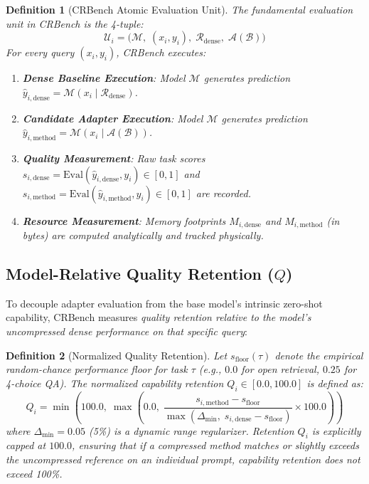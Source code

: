 \documentclass[11pt,a4paper]{article}
\newtheorem{definition}{Definition}
\begin{document}
\begin{definition}[CRBench Atomic Evaluation Unit]
The fundamental evaluation unit in CRBench is the 4-tuple:
\begin{equation}
\label{eq:eval_unit}
\boxed{
\mathcal{U}_i = \Big( \mathcal{M}, \; (x_i, y_i), \; \mathcal{R}_{\text{dense}}, \; \mathcal{A}(\mathcal{B}) \Big)
}
\end{equation}
For every query $(x_i, y_i)$, CRBench executes:
\begin{enumerate}[leftmargin=*]
    \item \textbf{Dense Baseline Execution}: Model $\mathcal{M}$ generates prediction $\hat{y}_{i, \text{dense}} = \mathcal{M}(x_i \mid \mathcal{R}_{\text{dense}})$.
    \item \textbf{Candidate Adapter Execution}: Model $\mathcal{M}$ generates prediction $\hat{y}_{i, \text{method}} = \mathcal{M}(x_i \mid \mathcal{A}(\mathcal{B}))$.
    \item \textbf{Quality Measurement}: Raw task scores $s_{i, \text{dense}} = \text{Eval}(\hat{y}_{i, \text{dense}}, y_i) \in [0, 1]$ and $s_{i, \text{method}} = \text{Eval}(\hat{y}_{i, \text{method}}, y_i) \in [0, 1]$ are recorded.
    \item \textbf{Resource Measurement}: Memory footprints $M_{i, \text{dense}}$ and $M_{i, \text{method}}$ (in bytes) are computed analytically and tracked physically.
\end{enumerate}
\end{definition}

\subsection{Model-Relative Quality Retention ($Q$)}
To decouple adapter evaluation from the base model's intrinsic zero-shot capability, CRBench measures \textit{quality retention relative to the model's uncompressed dense performance on that specific query}:

\begin{definition}[Normalized Quality Retention]
Let $s_{\text{floor}}(\tau)$ denote the empirical random-chance performance floor for task $\tau$ (e.g., $0.0$ for open retrieval, $0.25$ for 4-choice QA). The normalized capability retention $Q_i \in [0.0, 100.0]$ is defined as:
\begin{equation}
\label{eq:quality_retention}
\boxed{
Q_i = \min\left(100.0, \; \max\left(0.0, \; \frac{s_{i, \text{method}} - s_{\text{floor}}}{\max\left(\Delta_{\min}, \; s_{i, \text{dense}} - s_{\text{floor}}\right)} \times 100.0\right)\right)
}
\end{equation}
where $\Delta_{\min} = 0.05$ (5\%) is a dynamic range regularizer. Retention $Q_i$ is explicitly capped at $100.0$, ensuring that if a compressed method matches or slightly exceeds the uncompressed reference on an individual prompt, capability retention does not exceed 100\%.
\end{definition}
\end{document}
